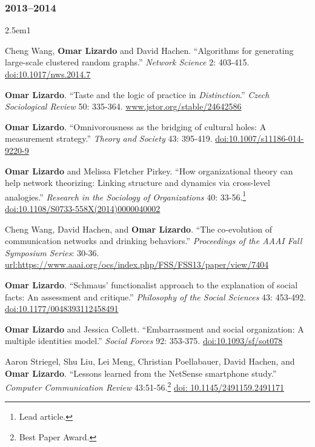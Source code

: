 \documentclass[
]{article}
\newenvironment{cventry}{\begin{hangparas}{2.5em}{1}}{\end{hangparas}}
\begin{document}
\subsubsection{2013--2014}\label{section-8}

\begin{cventry}

Cheng Wang, \textbf{Omar Lizardo} and David Hachen. ``Algorithms for
generating large-scale clustered random graphs.'' \emph{Network Science}
2: 403-415.
\href{https://doi.org/10.1017/nws.2014.7}{doi:10.1017/nws.2014.7}

\textbf{Omar Lizardo}. ``Taste and the logic of practice in
\emph{Distinction}.'' \emph{Czech Sociological Review} 50: 335-364.
\href{https://www.jstor.org/stable/24642586}{www.jstor.org/stable/24642586}

\textbf{Omar Lizardo}. ``Omnivorousness as the bridging of cultural
holes: A measurement strategy.'' \emph{Theory and Society} 43: 395-419.
\href{https://doi.org/10.1007/s11186-014-9220-9}{doi:10.1007/s11186-014-9220-9}

\textbf{Omar Lizardo} and Melissa Fletcher Pirkey. ``How organizational
theory can help network theorizing: Linking structure and dynamics via
cross-level analogies.'' \emph{Research in the Sociology of
Organizations} 40: 33-56.\footnote{Lead article.}
\href{https://doi.org/10.1108/S0733-558X(2014)0000040002}{doi:10.1108/S0733-558X(2014)0000040002}

Cheng Wang, David Hachen, and \textbf{Omar Lizardo}. ``The co-evolution
of communication networks and drinking behaviors.'' \emph{Proceedings of
the AAAI Fall Symposium Series}: 30-36.
\href{https://www.aaai.org/ocs/index.php/FSS/FSS13/paper/view/7404}{url:https://www.aaai.org/ocs/index.php/FSS/FSS13/paper/view/7404}

\textbf{Omar Lizardo}. ``Schmaus' functionalist approach to the
explanation of social facts: An assessment and critique.''
\emph{Philosophy of the Social Sciences} 43: 453-492.
\href{https://doi.org/10.1177/0048393112458491}{doi:10.1177/0048393112458491}

\textbf{Omar Lizardo} and Jessica Collett. ``Embarrassment and social
organization: A multiple identities model.'' \emph{Social Forces} 92:
353-375. \href{https://doi.org/10.1093/sf/sot078}{doi:10.1093/sf/sot078}

Aaron Striegel, Shu Liu, Lei Meng, Christian Poellabauer, David Hachen,
and \textbf{Omar Lizardo}. ``Lessons learned from the NetSense
smartphone study.'' \emph{Computer Communication Review}
43:51-56.\footnote{Best Paper Award.}
\href{https://doi.org/\%2010.1145/2491159.2491171}{doi:
10.1145/2491159.2491171}


\end{cventry}
\end{document}
